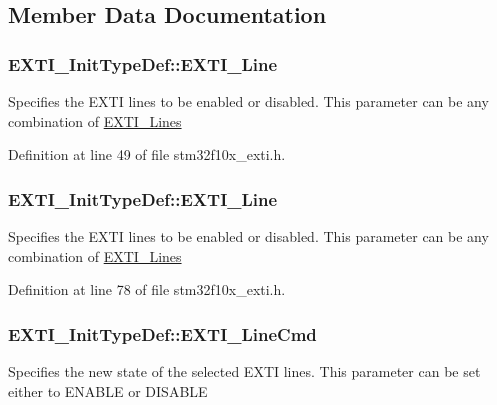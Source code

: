 \subsection{Member Data Documentation}
\subsubsection[{\texorpdfstring{E\+X\+T\+I\+\_\+\+Line}{EXTI_Line}}]{ E\+X\+T\+I\+\_\+\+Init\+Type\+Def\+::\+E\+X\+T\+I\+\_\+\+Line}\hypertarget{struct_e_x_t_i___init_type_def_a490f6df72047947d2d04228bc932c72c}{}\label{struct_e_x_t_i___init_type_def_a490f6df72047947d2d04228bc932c72c}
Specifies the E\+X\+TI lines to be enabled or disabled. This parameter can be any combination of \hyperlink{group___e_x_t_i___lines}{E\+X\+T\+I\+\_\+\+Lines} 

Definition at line 49 of file stm32f10x\+\_\+exti.\+h.

\subsubsection[{\texorpdfstring{E\+X\+T\+I\+\_\+\+Line}{EXTI_Line}}]{ E\+X\+T\+I\+\_\+\+Init\+Type\+Def\+::\+E\+X\+T\+I\+\_\+\+Line}\hypertarget{struct_e_x_t_i___init_type_def_a1b5bb38e1df331f764b830a1e8ec171f}{}\label{struct_e_x_t_i___init_type_def_a1b5bb38e1df331f764b830a1e8ec171f}
Specifies the E\+X\+TI lines to be enabled or disabled. This parameter can be any combination of \hyperlink{group___e_x_t_i___lines}{E\+X\+T\+I\+\_\+\+Lines} 

Definition at line 78 of file stm32f10x\+\_\+exti.\+h.

\subsubsection[{\texorpdfstring{E\+X\+T\+I\+\_\+\+Line\+Cmd}{EXTI_LineCmd}}]{ E\+X\+T\+I\+\_\+\+Init\+Type\+Def\+::\+E\+X\+T\+I\+\_\+\+Line\+Cmd}\hypertarget{struct_e_x_t_i___init_type_def_ac1769bc5badaef4cffbcf105e3fe1c27}{}\label{struct_e_x_t_i___init_type_def_ac1769bc5badaef4cffbcf105e3fe1c27}
Specifies the new state of the selected E\+X\+TI lines. This parameter can be set either to E\+N\+A\+B\+LE or D\+I\+S\+A\+B\+LE 

